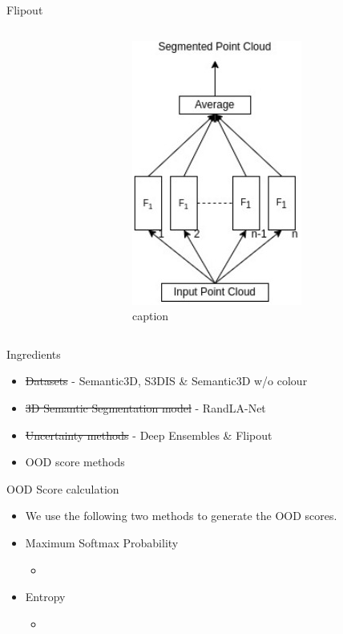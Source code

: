 \documentclass[aspectratio=169]{beamer}
\begin{document}
\begin{frame}{Flipout}
    \begin{columns}
        \begin{column}{0.5\textwidth}
            
        \end{column}
        \begin{column}{0.5\textwidth}
            \begin{figure}
                \centering
                \includegraphics[scale=0.5]{images/flipout.jpg}
                \caption{caption}
                \label{fig:flipout_work}
            \end{figure}
        \end{column}
    \end{columns}
\end{frame}
\begin{frame}{Ingredients}
    \begin{itemize}
        \item \st{Datasets} - Semantic3D, S3DIS \& Semantic3D w/o colour
        \item \st{3D Semantic Segmentation model} - RandLA-Net
        \item \st{Uncertainty methods} - Deep Ensembles \& Flipout
        \item OOD score methods
    \end{itemize}
\end{frame}
\begin{frame}{OOD Score calculation}
    \begin{itemize}
        \item We use the following two methods to generate the OOD scores.
        \item Maximum Softmax Probability
        \begin{itemize}
            \item 
        \end{itemize}
        \item Entropy
        \begin{itemize}
            \item 
        \end{itemize}
    \end{itemize}
\end{frame}
\end{document}

